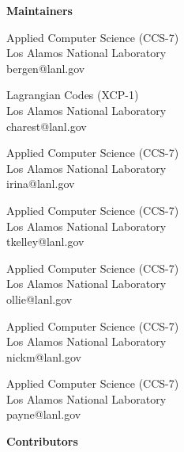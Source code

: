 \begin{multicols}{2}
{\huge \textbf{Maintainers}}

\vspace{0.25cm}

{Applied Computer Science (CCS-7)\\
Los Alamos National Laboratory\\
bergen@lanl.gov}

{Lagrangian Codes (XCP-1)\\
Los Alamos National Laboratory\\
charest@lanl.gov}

{Applied Computer Science (CCS-7)\\
Los Alamos National Laboratory\\
irina@lanl.gov}

{Applied Computer Science (CCS-7)\\
Los Alamos National Laboratory\\
tkelley@lanl.gov}

{Applied Computer Science (CCS-7)\\
Los Alamos National Laboratory\\
ollie@lanl.gov}

{Applied Computer Science (CCS-7)\\
Los Alamos National Laboratory\\
nickm@lanl.gov}

{Applied Computer Science (CCS-7)\\
Los Alamos National Laboratory\\
payne@lanl.gov}

\vfill
\columnbreak

{\huge \textbf{Contributors}}

\vspace{0.25cm}


\vfill
\end{multicols}

\pagebreak

